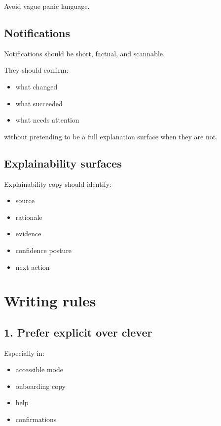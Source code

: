 Avoid vague panic language.

\subsection{Notifications}\label{record-040-notifications}

Notifications should be short, factual, and scannable.

They should confirm:

\begin{itemize}
\tightlist
\item
  what changed
\item
  what succeeded
\item
  what needs attention
\end{itemize}

without pretending to be a full explanation surface when they are not.

\subsection{Explainability surfaces}\label{record-040-explainability-surfaces}

Explainability copy should identify:

\begin{itemize}
\tightlist
\item
  source
\item
  rationale
\item
  evidence
\item
  confidence posture
\item
  next action
\end{itemize}

\section{Writing rules}\label{record-040-writing-rules}

\subsection{1. Prefer explicit over clever}\label{record-040-prefer-explicit-over-clever}

Especially in:

\begin{itemize}
\tightlist
\item
  accessible mode
\item
  onboarding copy
\item
  help
\item
  confirmations
\end{itemize}

